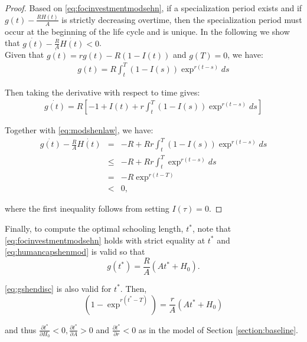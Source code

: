 \begin{proof}
Based on \eqref{eq:focinvestmentmodsehn}, if a specialization period exists and if $g(t) - \frac{RH(t)}{A}$ is strictly decreasing overtime, then the specialization period must occur at the beginning of the life cycle and is unique. In the following we show that $\dot{g(t)} - \frac{R}{A}\dot{H(t)} < 0$.\\

\indent Given that $\dot{g(t)} = rg(t) - R(1-I(t))$ and $g(T)=0$, we have:
\begin{eqnarray}
g(t) = R \int_t^T (1-I(s)) \exp^{r(t-s)} ds \label{eq:gshendisc}
\end{eqnarray}

\noindent Then taking the derivative with respect to time gives:
\begin{eqnarray}
\dot{g(t)} = R \left[ -1 + I(t) + r\int_t^T (1-I(s)) \exp^{r(t-s)} ds \right] 
\end{eqnarray}

\noindent Together with \eqref{eq:modshenlaw}, we have:
\begin{eqnarray}
\dot{g(t)} - \frac{R}{A} \dot{H(t)} &=& -R + Rr\int_t^T (1-I(s)) \exp^{r(t-s)} ds\\
&\leq & -R + Rr\int_t^T \exp^{r(t-s)} ds \\
&=& -R\exp^{r(t-T)} \\
&<& 0,  
\end{eqnarray}

\noindent where the first inequality follows from setting $I(\tau)=0$.
\end{proof}

\indent Finally, to compute the optimal schooling length, $t^*$, note that \eqref{eq:focinvestmentmodsehn} holds with strict equality at $t^*$ and \eqref{eq:humancapshenmod} is valid so that
\begin{equation}
g(t^*) = \frac{R}{A} \left( A t^* + H_{0} \right). 
\end{equation}

\noindent \eqref{eq:gshendisc} is also valid for $t^*$. Then,
\begin{equation}
\left( 1 - \exp^{r(t^*-T)} \right) = \frac{r}{A} \left( A t^* + H_{0} \right)
\end{equation}

\noindent and thus $\frac{\partial t^*}{\partial H_{0}} < 0, \frac{\partial t^*}{\partial A}> 0$ and $\frac{\partial t^*}{\partial r} < 0$ as in the model of Section \ref{section:baseline}. 
 
